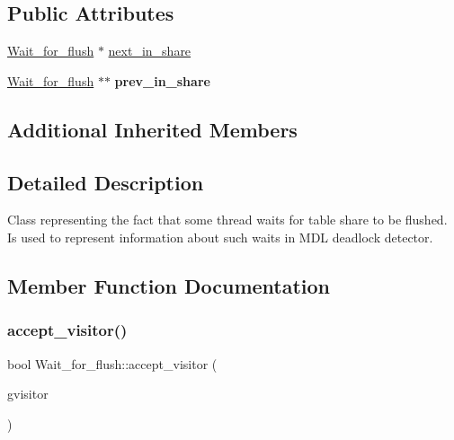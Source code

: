 \subsection*{Public Attributes}
\begin{DoxyCompactItemize}
\item 
\mbox{\hyperlink{classWait__for__flush}{Wait\+\_\+for\+\_\+flush}} $\ast$ \mbox{\hyperlink{classWait__for__flush_a4c6991330bc28f7cdbc2a924dfef3a38}{next\+\_\+in\+\_\+share}}
\item 
\mbox{\label{classWait__for__flush_a3bfca0789d5737d3c2dfc7d33f2e67cc}} 
\mbox{\hyperlink{classWait__for__flush}{Wait\+\_\+for\+\_\+flush}} $\ast$$\ast$ {\bfseries prev\+\_\+in\+\_\+share}
\end{DoxyCompactItemize}
\subsection*{Additional Inherited Members}


\subsection{Detailed Description}
Class representing the fact that some thread waits for table share to be flushed. Is used to represent information about such waits in M\+DL deadlock detector. 

\subsection{Member Function Documentation}
\mbox{\label{classWait__for__flush_a5d355af9c8dd888cf46b6c5c24552900}} 
\subsubsection{\texorpdfstring{accept\+\_\+visitor()}{accept\_visitor()}}
{\footnotesize\ttfamily bool Wait\+\_\+for\+\_\+flush\+::accept\+\_\+visitor (\begin{DoxyParamCaption}\item[{\mbox{\hyperlink{classMDL__wait__for__graph__visitor}{M\+D\+L\+\_\+wait\+\_\+for\+\_\+graph\+\_\+visitor}} $\ast$}]{gvisitor }\end{DoxyParamCaption})\hspace{0.3cm}{\ttfamily [virtual]}}

